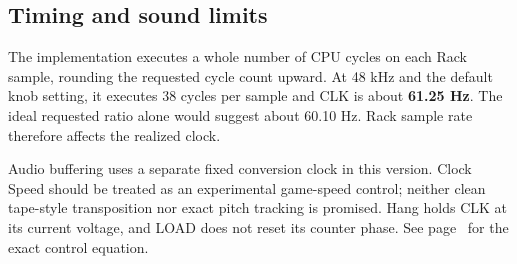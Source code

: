 \subsection{Timing and sound limits}
The implementation executes a whole number of CPU cycles on each Rack
sample, rounding the requested cycle count upward. At 48 kHz and the default
knob setting, it executes 38 cycles per sample and CLK is about
\textbf{61.25 Hz}. The ideal requested ratio alone would suggest about
60.10 Hz. Rack sample rate therefore affects the realized clock.

Audio buffering uses a separate fixed conversion clock in this version.
Clock Speed should be treated as an experimental game-speed control;
neither clean tape-style transposition nor exact pitch tracking is promised.
Hang holds CLK at its current voltage, and LOAD does not reset its counter
phase. See page~\pageref{sec:reference} for the exact control equation.
